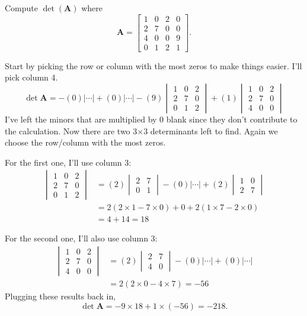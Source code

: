\begin{exercise} %
    Compute $\det(\mathbf{A})$ where
    \[
        \mathbf{A} = \begin{bmatrix}
            1 & 0 & 2 & 0 \\
            2 & 7 & 0 & 0 \\
            4 & 0 & 0 & 9 \\
            0 & 1 & 2 & 1
        \end{bmatrix}.
    \]
\end{exercise}

\begin{solution}
Start by picking the row or column with the most zeros to make things
easier. I’ll pick column 4.
    \[
        \det \mathbf{A} = -(0)|\cdots| + (0)|\cdots|
        -(9)\begin{vmatrix}1&0&2\\2&7&0\\0&1&2\end{vmatrix}
        +(1)\begin{vmatrix}1&0&2\\2&7&0\\4&0&0\end{vmatrix}
    \]
I’ve left the minors that are multiplied by 0 blank since they don’t contribute to the calculation. Now there are two 3×3 determinants left to find. Again we choose the row/column with the most zeros.

For the first one, I’ll use column 3:
    \begin{align*}
        \begin{vmatrix}1&0&2\\2&7&0\\0&1&2\end{vmatrix}
        &= (2)\begin{vmatrix}2&7\\0&1\end{vmatrix}
          - (0)|\cdots|
          + (2)\begin{vmatrix}1&0\\2&7\end{vmatrix} \\
        &= 2(2 \times 1 - 7 \times 0) + 0 + 2(1 \times 7 - 2 \times 0) \\
        &= 4 + 14 = 18
    \end{align*}

For the second one, I'll also use column 3:
    \begin{align*}
        \begin{vmatrix}1&0&2\\2&7&0\\4&0&0\end{vmatrix}
        &= (2)\begin{vmatrix}2&7\\4&0\end{vmatrix}
          - (0)|\cdots|
          + (0)|\cdots| \\
        &= 2(2 \times 0 - 4 \times 7) = -56
    \end{align*}
Plugging these results back in,
    \[
        \det \mathbf{A} = -9 \times 18 + 1 \times(-56) = -218.
    \]
\end{solution}

